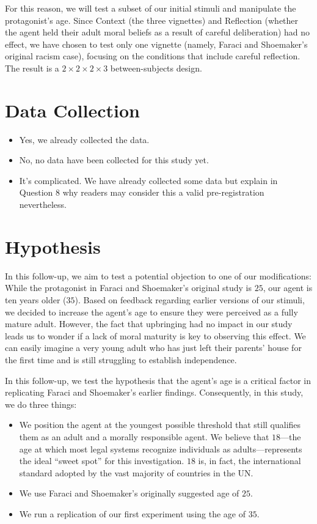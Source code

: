 \documentclass[scrarticle]{scrartcl}
\begin{document}
For this reason, we will test a subset of our initial stimuli and manipulate the protagonist's age.
Since Context (the three vignettes) and Reflection (whether the agent held their adult moral beliefs as a result of careful deliberation) had no effect, we have chosen to test only one vignette (namely, Faraci and Shoemaker's original racism case), focusing on the conditions that include careful reflection.
The result is a $2 \times 2 \times 2 \times 3$ between-subjects design.


\section{Data Collection}
\begin{itemize}[label=\Square,noitemsep]
   \item Yes, we already collected the data.
   \item[\XBox] No, no data have been collected for this study yet.
   \item It's complicated. We have already collected some data but explain in Question $8$ why readers may consider this a valid pre-registration nevertheless.
\end{itemize}


\section{Hypothesis}
In this follow-up, we aim to test a potential objection to one of our modifications:
While the protagonist in Faraci and Shoemaker's original study is $25$, our agent is ten years older ($35$).
Based on feedback regarding earlier versions of our stimuli, we decided to increase the agent's age to ensure they were perceived as a fully mature adult.
However, the fact that upbringing had no impact in our study leads us to wonder if a lack of moral maturity is key to observing this effect.
We can easily imagine a very young adult who has just left their parents' house for the first time and is still struggling to establish independence.

In this follow-up, we test the hypothesis that the agent's age is a critical factor in replicating Faraci and Shoemaker's earlier findings.
Consequently, in this study, we do three things:

\begin{itemize}
   \item[(1)] We position the agent at the youngest possible threshold that still qualifies them as an adult and a morally responsible agent. We believe that $18$---the age at which most legal systems recognize individuals as adults---represents the ideal \enquote{sweet spot} for this investigation. $18$ is, in fact, the international standard adopted by the vast majority of countries in the UN.
   \item[(2)] We use Faraci and Shoemaker's originally suggested age of $25$.
   \item[(3)] We run a replication of our first experiment using the age of $35$.
\end{itemize}
\end{document}
